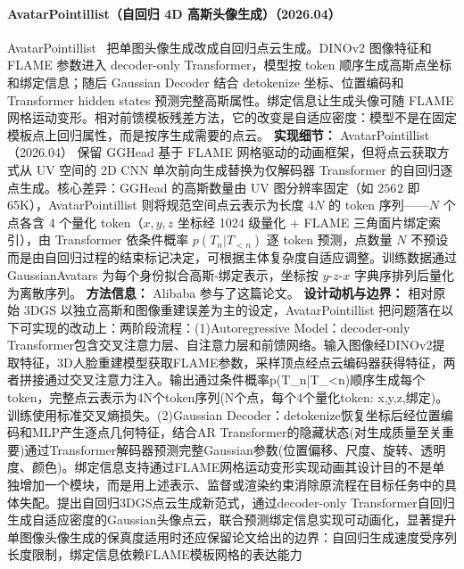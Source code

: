 \paragraph{AvatarPointillist（自回归 4D 高斯头像生成）（2026.04）}
AvatarPointillist~\cite{2604_04787} 把单图头像生成改成自回归点云生成。DINOv2 图像特征和 FLAME 参数进入 decoder-only Transformer，模型按 token 顺序生成高斯点坐标和绑定信息；随后 Gaussian Decoder 结合 detokenize 坐标、位置编码和 Transformer hidden states 预测完整高斯属性。绑定信息让生成头像可随 FLAME 网格运动变形。相对前馈模板残差方法，它的改变是自适应密度：模型不是在固定模板点上回归属性，而是按序生成需要的点云。
\textbf{实现细节：} AvatarPointillist（2026.04） 保留 GGHead 基于 FLAME 网格驱动的动画框架，但将点云获取方式从 UV 空间的 2D CNN 单次前向生成替换为仅解码器 Transformer 的自回归逐点生成。核心差异：GGHead 的高斯数量由 UV 图分辨率固定（如 $256^{}2$ 即 65K），AvatarPointillist 则将规范空间点云表示为长度 $4N$ 的 token 序列——$N$ 个点各含 4 个量化 token（$x, y, z$ 坐标经 1024 级量化 + FLAME 三角面片绑定索引），由 Transformer 依条件概率 $p(T_n | T_{<n})$ 逐 token 预测，点数量 $N$ 不预设而是由自回归过程的结束标记决定，可根据主体复杂度自适应调整。训练数据通过 GaussianAvatars 为每个身份拟合高斯-绑定表示，坐标按 $y$-$z$-$x$ 字典序排列后量化为离散序列。
\textbf{方法信息：} Alibaba 参与了这篇论文。
\textbf{设计动机与边界：} 相对原始 3DGS 以独立高斯和图像重建误差为主的设定，AvatarPointillist 把问题落在以下可实现的改动上：两阶段流程：(1)Autoregressive Model：decoder-only Transformer包含交叉注意力层、自注意力层和前馈网络。输入图像经DINOv2提取特征，3D人脸重建模型获取FLAME参数，采样顶点经点云编码器获得特征，两者拼接通过交叉注意力注入。输出通过条件概率p(T\_n|T\_<n)顺序生成每个token，完整点云表示为4N个token序列(N个点，每个4个量化token: x,y,z,绑定)。训练使用标准交叉熵损失。(2)Gaussian Decoder：detokenize恢复坐标后经位置编码和MLP产生逐点几何特征，结合AR Transformer的隐藏状态(对生成质量至关重要)通过Transformer解码器预测完整Gaussian参数(位置偏移、尺度、旋转、透明度、颜色)。绑定信息支持通过FLAME网格运动变形实现动画其设计目的不是单独增加一个模块，而是用上述表示、监督或渲染约束消除原流程在目标任务中的具体失配。提出自回归3DGS点云生成新范式，通过decoder-only Transformer自回归生成自适应密度的Gaussian头像点云，联合预测绑定信息实现可动画化，显著提升单图像头像生成的保真度适用时还应保留论文给出的边界：自回归生成速度受序列长度限制，绑定信息依赖FLAME模板网格的表达能力
